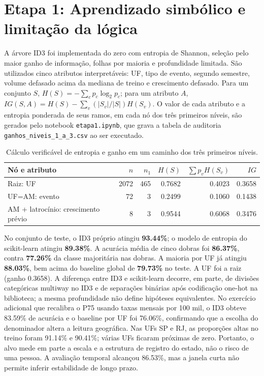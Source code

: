 \documentclass[12pt,a4paper]{article}
\begin{document}
\section{Etapa 1: Aprendizado simbólico e limitação da lógica}
A árvore ID3 foi implementada do zero com entropia de Shannon, seleção pelo maior ganho de informação, folhas por maioria e profundidade limitada. São utilizados cinco atributos interpretáveis: UF, tipo de evento, segundo semestre, volume defasado acima da mediana de treino e crescimento defasado. Para um conjunto $S$, $H(S)=-\sum_c p_c\log_2p_c$; para um atributo $A$, $IG(S,A)=H(S)-\sum_v(|S_v|/|S|)H(S_v)$. O valor de cada atributo e a entropia ponderada de seus ramos, em cada nó dos três primeiros níveis, são gerados pelo notebook \texttt{etapa1.ipynb}, que grava a tabela de auditoria \texttt{ganhos\_niveis\_1\_a\_3.csv} ao ser executado.

\begin{table}[H]\centering\small
\caption{Cálculo verificável de entropia e ganho em um caminho dos três primeiros níveis.}
\begin{tabular}{@{}p{2.4cm}r r r r r@{}}\toprule
Nó e atributo & $n$ & $n_1$ & $H(S)$ & $\sum p_vH(S_v)$ & $IG$ \\ \midrule
Raiz: UF & 2072 & 465 & 0.7682 & 0.4023 & 0.3658 \\
UF=AM: evento & 72 & 3 & 0.2499 & 0.1060 & 0.1438 \\
AM + latrocínio: crescimento prévio & 8 & 3 & 0.9544 & 0.6068 & 0.3476 \\
\bottomrule\end{tabular}\label{tab:ganhos}\end{table}

No conjunto de teste, o ID3 próprio atingiu \textbf{93.44\%}; o modelo de entropia do scikit-learn atingiu \textbf{89.38\%}. A acurácia média de cinco dobras foi \textbf{86.37\%}, contra \textbf{77.26\%} da classe majoritária nas dobras. A maioria por UF já atingiu \textbf{88.03\%}, bem acima do baseline global de \textbf{79.73\%} no teste. A UF foi a raiz (ganho 0.3658). A diferença entre ID3 e scikit-learn decorre, em parte, de divisões categóricas multiway no ID3 e de separações binárias após codificação one-hot na biblioteca; a mesma profundidade não define hipóteses equivalentes. No exercício adicional que recalibra o P75 usando taxas mensais por 100 mil, o ID3 obteve 83.59\% de acurácia e o baseline por UF foi 76.06\%, confirmando que a escolha do denominador altera a leitura geográfica. Nas UFs SP e RJ, as proporções altas no treino foram 91.14\% e 90.41\%; várias UFs ficaram próximas de zero. Portanto, o alvo mede em parte a escala e a estrutura de registro do estado, não o risco de uma pessoa. A avaliação temporal alcançou 86.53\%, mas a janela curta não permite inferir estabilidade de longo prazo.
\end{document}
